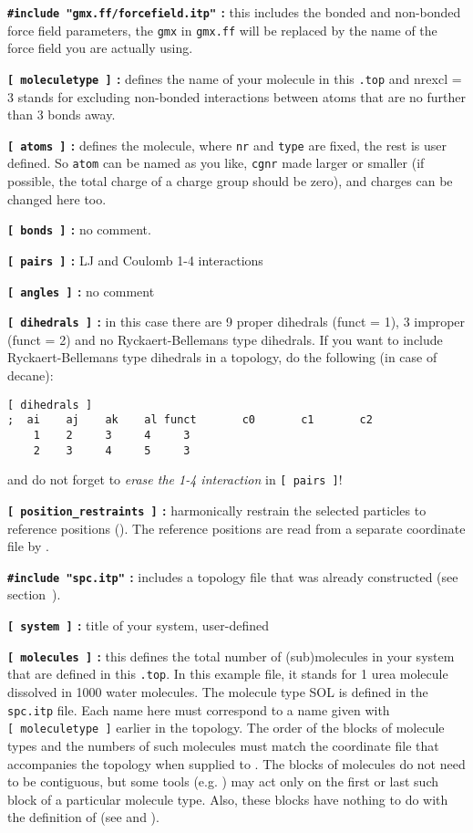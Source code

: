 %

{\bf {\tt \#include "gmx.ff/forcefield.itp"} :} this includes the bonded and
non-bonded force field parameters, the {\tt gmx} in {\tt gmx.ff} will be
replaced by the name of the force field you are actually using.

{\bf {\tt [~moleculetype~]} :} defines the name of your molecule in
this {\tt *.top} and nrexcl = 3 stands for excluding non-bonded
interactions between atoms that are no further than 3 bonds away.

{\bf {\tt [~atoms~]} :} defines the molecule, where {\tt nr} and
{\tt type} are fixed, the rest is user defined. So {\tt atom} can be named
as you like, {\tt cgnr} made larger or smaller (if possible, the total
charge of a charge group should be zero), and charges can be changed
here too.

{\bf {\tt [~bonds~]} :} no comment.

{\bf {\tt [~pairs~]} :} LJ and Coulomb 1-4 interactions

{\bf {\tt [~angles~]} :} no comment

{\bf {\tt [~dihedrals~]} :} in this case there are 9 proper dihedrals
(funct = 1), 3 improper (funct = 2) and no Ryckaert-Bellemans type
dihedrals. If you want to include Ryckaert-Bellemans type dihedrals
in a topology, do the following (in case of {\eg} decane):
\begin{verbatim}
[ dihedrals ]
;  ai    aj    ak    al funct       c0       c1       c2
    1    2     3     4     3 
    2    3     4     5     3
\end{verbatim}
and do not forget to {\em erase the 1-4 interaction} 
in {\tt [~pairs~]}!

{\bf {\tt [~position_restraints~]} :} harmonically restrain the selected particles
to reference positions (). 
The reference positions are read from a 
separate coordinate file by {\tt {}}.

{\bf {\tt \#include "spc.itp"} :} includes a topology file that was already
constructed (see section~).

{\bf {\tt [~system~]} :} title of your system, user-defined

{\bf {\tt [~molecules~]} :} this defines the total number of (sub)molecules
in your system that are defined in this {\tt *.top}. In this
example file, it stands for 1 urea molecule dissolved in 1000 water
molecules. The molecule type SOL is defined in the {\tt spc.itp} file.
Each name here must correspond to a name given with {\tt [~moleculetype~]}
earlier in the topology. The order of the blocks of molecule types and
the numbers of such molecules must match the coordinate file that
accompanies the topology when supplied to {\tt {}}.
The blocks of molecules do not need to be contiguous, but some
tools (e.g. {\tt {}}) may act only on the first or
last such block of a particular molecule type. Also, these blocks
have nothing to do with the definition of 
(see  and ).

